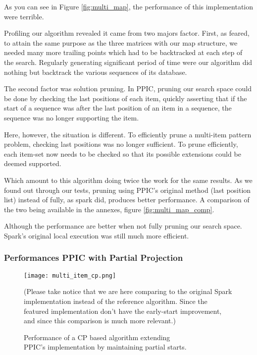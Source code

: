 \documentclass{eplmastersthesis}
\begin{document}
As you can see in Figure \ref{fig:multi_map}, the performance of this implementation were terrible. \newline

Profiling our algorithm revealed it came from two majors factor. First, as feared, to attain the same purpose as the three matrices with our map structure, we needed many more trailing points which had to be backtracked at each step of the search. Regularly generating significant period of time were our algorithm did nothing but backtrack the various sequences of its database. \newline

The second factor was solution pruning. In PPIC, pruning our search space could be done by checking the last positions of each item, quickly asserting that if the start of a sequence was after the last position of an item in a sequence, the sequence was no longer supporting the item. \newline

Here, however, the situation is different. To efficiently prune a multi-item pattern problem, checking last positions was no longer sufficient. To prune efficiently, each item-set now needs to be checked so that its possible extensions could be deemed supported. \newline

Which amount to this algorithm doing twice the work for the same results. As we found out through our tests, pruning using PPIC's original method (last position list) instead of fully, as spark did, produces better performance. A comparison of the two being available in the annexes, figure \ref{fig:multi_map_comp}. \newline

Although the performance are better when not fully pruning our search space. Spark's original local execution was still much more efficient.

\subsubsection{Performances PPIC with Partial Projection}

\begin{figure}[h]
  \centering
  \texttt{[image: multi\_item\_cp.png]}
  \caption[PPIC with partial starts]{
  		Performance of a CP based algorithm extending \\
  		PPIC's implementation by maintaining partial starts.
  	\endtabular
  }
  \label{fig:multi_array}
  (Please take notice that we are here comparing to the original Spark implementation instead of the reference algorithm. Since the featured implementation don't have the early-start improvement, and since this comparison is much more relevant.)
\end{figure}
\end{document}

